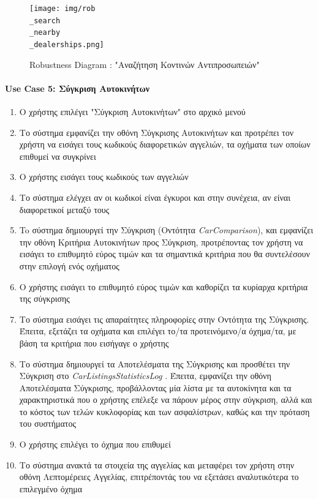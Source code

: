 \documentclass{../ol-softwaremanual}
\begin{document}
	\begin{figure}[htbp!]
		\texttt{[image: img/rob\\\_search\\\_nearby\\\_dealerships.png]}
		\caption{\en Robustness Diagram : "\gr Αναζήτηση Κοντινών Αντιπροσωπειών\en"\gr}
	\end{figure}
	
	\newpage
	
	\centering
	
	\paragraph{\en Use Case 5: \gr Σύγκριση Αυτοκινήτων}
	\begin{enumerate}
		\item Ο χρήστης επιλέγει \en"\gr Σύγκριση Αυτοκινήτων\en" \gr στο αρχικό μενού
		\item Το σύστημα εμφανίζει την οθόνη Σύγκρισης Αυτοκινήτων και προτρέπει τον χρήστη να εισάγει τους κωδικούς διαφορετικών αγγελιών, τα οχήματα των οποίων επιθυμεί να συγκρίνει
		\item Ο χρήστης εισάγει τους κωδικούς των αγγελιών
		\item Το σύστημα ελέγχει αν οι κωδικοί είναι έγκυροι και στην συνέχεια, αν είναι διαφορετικοί μεταξύ τους
		\item To σύστημα δημιουργεί την Σύγκριση (Οντότητα \en \textit{CarComparison}\gr),  και εμφανίζει την οθόνη Κριτήρια Αυτοκινήτων προς Σύγκριση, προτρέποντας τον χρήστη να εισάγει το επιθυμητό εύρος τιμών και τα σημαντικά κριτήρια που θα συντελέσουν στην επιλογή ενός οχήματος
		\item Ο χρήστης εισάγει το επιθυμητό εύρος τιμών και καθορίζει τα κυρίαρχα κριτήρια της σύγκρισης
		\item Το σύστημα εισάγει τις απαραίτητες πληροφορίες στην Οντότητα της Σύγκρισης. Έπειτα, εξετάζει τα οχήματα και επιλέγει το/τα προτεινόμενο/α όχημα/τα, με βάση τα κριτήρια που εισήγαγε ο χρήστης
		\item Το σύστημα δημιουργεί τα Αποτελέσματα της Σύγκρισης και προσθέτει την Σύγκριση στο \en \textit{CarListingsStatisticsLog} \gr. Έπειτα, εμφανίζει την οθόνη Αποτελέσματα Σύγκρισης, προβάλλοντας μία λίστα με τα αυτοκίνητα και τα χαρακτηριστικά που ο χρήστης επέλεξε να πάρουν μέρος στην σύγκριση, αλλά και το κόστος των τελών κυκλοφορίας και των ασφαλίστρων, καθώς και την πρόταση του συστήματος 
		\item Ο χρήστης επιλέγει το όχημα που επιθυμεί
		\item Το σύστημα ανακτά τα στοιχεία της αγγελίας και μεταφέρει τον χρήστη στην οθόνη Λεπτομέρειες Αγγελίας, επιτρέποντάς του να εξετάσει αναλυτικότερα το επιλεγμένο όχημα
	\end{enumerate}
\end{document}
